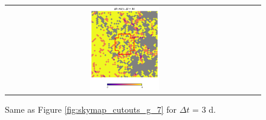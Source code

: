 \documentclass[preprintm,linenumbers]{aastex631}
\begin{document}
\begin{figure}
\begin{tabular}{  c c c}
				\includegraphics[width=0.3\textwidth]{results/skymaps_cutout/skymaps_cutout_delta_first_year_one_snap_v4_0_10yrs_db_noDD_noTwi_tscale-3_nside-256_doAllTemplateMetrics_reduceCount_g_GP_noDD_noTwi.pdf} \\
			\end{tabular}
			\caption{
   Same as Figure \ref{fig:skymap_cutouts_g_7} for $\Delta t$ = 3 d. 
    }
	\label{fig:skymap_cutouts_g_3}
		\end{figure}
\end{document}
